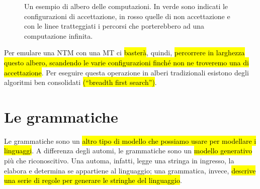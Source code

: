 \documentclass[a4paper,11pt,oneside]{article}
\theoremstyle{plain}
\theoremstyle{definition}
\theoremstyle{remark}
\begin{document}
\begin{figure}[htb]
  \centering
  \caption{Un esempio di albero delle computazioni. In verde sono indicati le
  configurazioni di accettazione, in rosso quelle di non accettazione e con le
  linee tratteggiati i percorsi che porterebbero ad una computazione infinita.}%
  \label{fig:albero-computazioni}
\end{figure}

Per emulare una NTM con una MT ci \hl{basterà}, quindi, \hl{percorrere in
larghezza questo albero, scandendo le varie configurazioni finché non ne
troveremo una di accettazione}. Per eseguire questa operazione in alberi
tradizionali esistono degli algoritmi ben consolidati
\hl{(``breadth first search'')}.

\section{Le grammatiche}\label{sec:grammatiche}

Le grammatiche sono un \hl{altro tipo di modello che possiamo usare per
modellare i linguaggi}. A differenza degli automi, le grammatiche sono un
\hl{modello generativo} più che riconoscitivo. Una automa, infatti, legge una
stringa in ingresso, la elabora e determina se appartiene al linguaggio; una
grammatica, invece, \hl{descrive una serie di regole per generare le stringhe
del linguaggio}.
\end{document}
